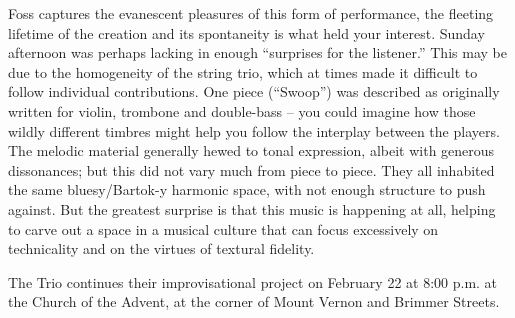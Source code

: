 Foss captures the evanescent pleasures of this form of performance, the fleeting lifetime of the creation and its spontaneity is what held your interest. Sunday afternoon was perhaps lacking in enough “surprises for the listener.” This may be due to the homogeneity of the string trio, which at times made it difficult to follow individual contributions. One piece (“Swoop”) was described as originally written for violin, trombone and double-bass – you could imagine how those wildly different timbres might help you follow the interplay between the players. The melodic material generally hewed to tonal expression, albeit with generous dissonances; but this did not vary much from piece to piece. They all inhabited the same bluesy/Bartok-y harmonic space, with not enough structure to push against. But the greatest surprise is that this music is happening at all, helping to carve out a space in a musical culture that can focus excessively on technicality and on the virtues of textural fidelity.

The Trio continues their improvisational project on February 22 at 8:00 p.m. at the Church of the Advent, at the corner of Mount Vernon and Brimmer Streets.
